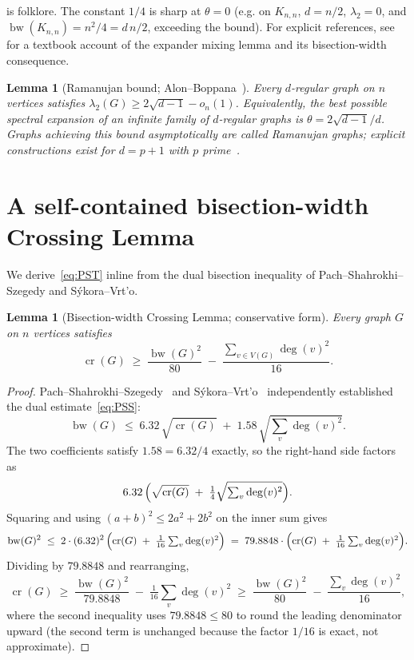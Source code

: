 \documentclass[11pt,a4paper]{article}
\newtheorem{lemma}[theorem]{Lemma}
\theoremstyle{definition}
\DeclareMathOperator{\crN}{cr}
\DeclareMathOperator{\bw}{bw}
\begin{document}
 is folklore. The constant $1/4$ is sharp at
$\theta = 0$ (e.g. on $K_{n,n}$, $d = n/2$, $\lambda_2 = 0$, and
$\bw(K_{n,n}) = n^{2}/4 = d\,n/2$, exceeding the bound). For
explicit references, see~\cite[Theorem 2.4]{HLW} for a textbook
account of the expander mixing lemma and its bisection-width
consequence.

\begin{lemma}[Ramanujan bound; Alon--Boppana~\cite{Alon86, Nilli}]\label{lem:ramanujan}
Every $d$-regular graph on $n$ vertices satisfies
$\lambda_2(G) \ge 2\sqrt{d - 1} - o_n(1)$. Equivalently, the best
possible spectral expansion of an infinite family of $d$-regular
graphs is $\theta = 2\sqrt{d - 1}/d$. Graphs achieving this bound
asymptotically are called \emph{Ramanujan graphs}; explicit
constructions exist for $d = p + 1$ with $p$ prime~\cite{LPS}.
\end{lemma}

\section{A self-contained bisection-width Crossing Lemma}\label{sec:PST}

We derive~\eqref{eq:PST} inline from the dual bisection inequality
of Pach--Shahrokhi--Szegedy and S\'ykora--Vrt'o.

\begin{lemma}[Bisection-width Crossing Lemma; conservative form]\label{lem:PST}
Every graph $G$ on $n$ vertices satisfies
\begin{equation}\label{eq:PST-explicit}
   \crN(G) \;\ge\; \frac{\bw(G)^{2}}{80} \;-\; \frac{\sum_{v \in V(G)} \deg(v)^{2}}{16}.
\end{equation}
\end{lemma}

\begin{proof}
Pach--Shahrokhi--Szegedy~\cite{PachShahrokhiSzegedy} and S\'ykora--Vrt'o~\cite{SykoraVrto}
independently established the dual estimate~\eqref{eq:PSS}:
\[
   \bw(G) \;\le\; 6.32\,\sqrt{\crN(G)} \;+\; 1.58\,\sqrt{\textstyle\sum_v \deg(v)^{2}}.
\]
The two coefficients satisfy $1.58 = 6.32 / 4$ exactly, so the
right-hand side factors as
\[
   6.32 \,\Bigl(\sqrt{\crN(G)} \;+\; \tfrac{1}{4}\sqrt{\textstyle\sum_v \deg(v)^{2}}\Bigr).
\]
Squaring and using $(a + b)^{2} \le 2 a^{2} + 2 b^{2}$ on the
inner sum gives
\[
   \bw(G)^{2} \;\le\; 2 \cdot (6.32)^{2}\,\Bigl(\crN(G) \;+\; \tfrac{1}{16}\textstyle\sum_v \deg(v)^{2}\Bigr)
              \;=\; 79.8848 \cdot \Bigl(\crN(G) \;+\; \tfrac{1}{16}\textstyle\sum_v \deg(v)^{2}\Bigr).
\]
Dividing by $79.8848$ and rearranging,
\[
   \crN(G) \;\ge\; \frac{\bw(G)^{2}}{79.8848} \;-\; \tfrac{1}{16} \textstyle\sum_v \deg(v)^{2}
   \;\ge\; \frac{\bw(G)^{2}}{80} \;-\; \frac{\textstyle\sum_v \deg(v)^{2}}{16},
\]
where the second inequality uses $79.8848 \le 80$ to round the leading
denominator upward (the second term is unchanged because the factor
$1/16$ is exact, not approximate).
\qedhere
\end{proof}
\end{document}
